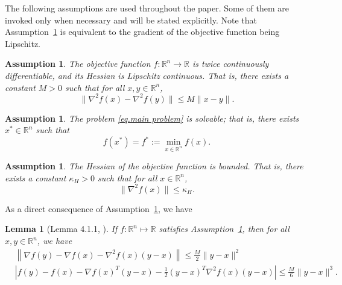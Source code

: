 \documentclass{article}
\newtheorem{lemma}[theorem]{Lemma}
\newtheorem{assumption}[theorem]{Assumption}
\numberwithin{equation}{section}
\numberwithin{equation}{section}
\begin{document}
The following assumptions are used throughout the paper. Some of them are invoked only when necessary and will be stated explicitly. Note that Assumption~\ref{assm.bounded hessian} is equivalent to the gradient of the objective function being Lipschitz.
\begin{assumption}
    \label{assm.lipschitz}
    The objective function $f: \mathbb{R}^n \to \mathbb{R}$ is twice continuously differentiable, and its Hessian is Lipschitz continuous. That is, there exists a constant $M > 0$ such that for all $x, y \in \mathbb{R}^n$,
    \begin{equation}
        \label{eq.main assm}
        \|\nabla^2 f(x) - \nabla^2 f(y)\| \leq M \|x - y\|. \end{equation}
\end{assumption}
\begin{assumption}
    \label{assm.solvable}
    The problem \eqref{eq.main problem} is solvable; that is, there exists $x^* \in \mathbb{R}^n$ such that
    \begin{equation*}
        f(x^*) = f^*:= \min_{x \in \mathbb{R}^n} f(x).
    \end{equation*}
\end{assumption}
\begin{assumption}
    \label{assm.bounded hessian}
    The Hessian of the objective function is bounded. That is, there exists a constant $\kappa_H > 0$ such that for all $x \in \mathbb{R}^n$, \begin{equation}
        \label{eq.bounded hessian}
        \|\nabla^2 f(x)\| \leq \kappa_H.
    \end{equation}
\end{assumption}
As a direct consequence of Assumption~\ref{assm.lipschitz}, we have
\begin{lemma}[Lemma 4.1.1, \citet{nesterov2018lectures}]\label{lem.lipschitz}
    If \(f:\mathbb{R}^n \mapsto \mathbb{R}\) satisfies Assumption~\ref{assm.lipschitz}, then for all \(x,y\in \mathbb{R}^n\), we have
    \begin{subequations}
        \begin{align}
            \label{eq.first-order exp}
             & \left\|\nabla f(y)-\nabla f(x)-\nabla^{2} f(x)(y-x)\right\|                       \leq \frac{M}{2}\|y-x\|^{2}  \\
            \label{eq.second-order exp}
             & \left|f(y)-f(x)-\nabla f(x)^T(y-x)-\frac{1}{2}(y-x)^T\nabla^{2} f(x)(y-x)\right|  \leq \frac{M}{6}\|y-x\|^{3}.
        \end{align}
    \end{subequations}
\end{lemma}
\end{document}
